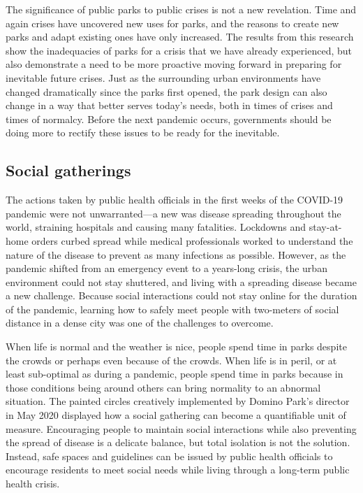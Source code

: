 The significance of public parks to public crises is not a new revelation. Time and again crises have uncovered new uses for parks, and the reasons to create new parks and adapt existing ones have only increased. The results from this research show the inadequacies of parks for a crisis that we have already experienced, but also demonstrate a need to be more proactive moving forward in preparing for inevitable future crises. Just as the surrounding urban environments have changed dramatically since the parks first opened, the park design can also change in a way that better serves today's needs, both in times of crises and times of normalcy. Before the next pandemic occurs, governments should be doing more to rectify these issues to be ready for the inevitable.

\begin{multicols}{2}
\section{Social gatherings}
The actions taken by public health officials in the first weeks of the COVID-19 pandemic were not unwarranted---a new was disease spreading throughout the world, straining hospitals and causing many fatalities. Lockdowns and stay-at-home orders curbed spread while medical professionals worked to understand the nature of the disease to prevent as many infections as possible. However, as the pandemic shifted from an emergency event to a years-long crisis, the urban environment could not stay shuttered, and living with a spreading disease became a new challenge. Because social interactions could not stay online for the duration of the pandemic, learning how to safely meet people with two-meters of social distance in a dense city was one of the challenges to overcome.

When life is normal and the weather is nice, people spend time in parks despite the crowds or perhaps even because of the crowds. When life is in peril, or at least sub-optimal as during a pandemic, people spend time in parks because in those conditions being around others can bring normality to an abnormal situation. The painted circles creatively implemented by Domino Park's director in May 2020 displayed how a social gathering can become a quantifiable unit of measure. Encouraging people to maintain social interactions while also preventing the spread of disease is a delicate balance, but total isolation is not the solution. Instead, safe spaces and guidelines can be issued by public health officials to encourage residents to meet social needs while living through a long-term public health crisis.


\end{multicols}
